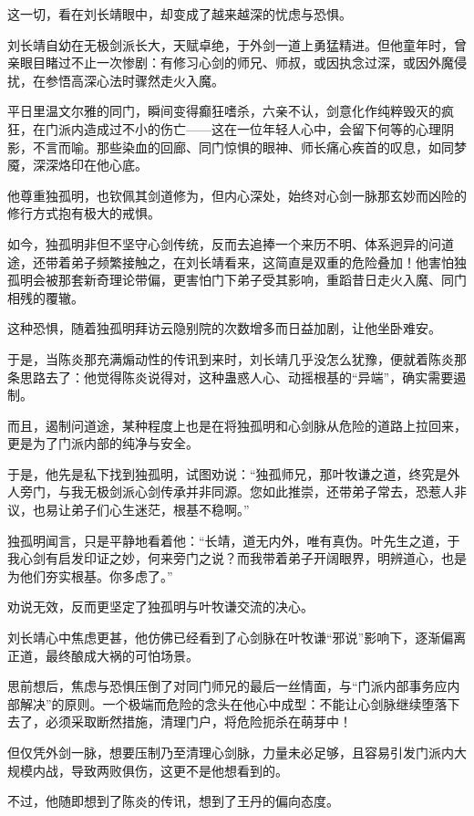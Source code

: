 这一切，看在刘长靖眼中，却变成了越来越深的忧虑与恐惧。

刘长靖自幼在无极剑派长大，天赋卓绝，于外剑一道上勇猛精进。但他童年时，曾亲眼目睹过不止一次惨剧：有修习心剑的师兄、师叔，或因执念过深，或因外魔侵扰，在参悟高深心法时骤然走火入魔。

平日里温文尔雅的同门，瞬间变得癫狂嗜杀，六亲不认，剑意化作纯粹毁灭的疯狂，在门派内造成过不小的伤亡——这在一位年轻人心中，会留下何等的心理阴影，不言而喻。那些染血的回廊、同门惊惧的眼神、师长痛心疾首的叹息，如同梦魇，深深烙印在他心底。

他尊重独孤明，也钦佩其剑道修为，但内心深处，始终对心剑一脉那玄妙而凶险的修行方式抱有极大的戒惧。

如今，独孤明非但不坚守心剑传统，反而去追捧一个来历不明、体系迥异的问道途，还带着弟子频繁接触之，在刘长靖看来，这简直是双重的危险叠加！他害怕独孤明会被那套新奇理论带偏，更害怕门下弟子受其影响，重蹈昔日走火入魔、同门相残的覆辙。

这种恐惧，随着独孤明拜访云隐别院的次数增多而日益加剧，让他坐卧难安。

于是，当陈炎那充满煽动性的传讯到来时，刘长靖几乎没怎么犹豫，便就着陈炎那条思路去了：他觉得陈炎说得对，这种蛊惑人心、动摇根基的“异端”，确实需要遏制。

而且，遏制问道途，某种程度上也是在将独孤明和心剑脉从危险的道路上拉回来，更是为了门派内部的纯净与安全。

于是，他先是私下找到独孤明，试图劝说：“独孤师兄，那叶牧谦之道，终究是外人旁门，与我无极剑派心剑传承并非同源。您如此推崇，还带弟子常去，恐惹人非议，也易让弟子们心生迷茫，根基不稳啊。”

独孤明闻言，只是平静地看着他：“长靖，道无内外，唯有真伪。叶先生之道，于我心剑有启发印证之妙，何来旁门之说？而我带着弟子开阔眼界，明辨道心，也是为他们夯实根基。你多虑了。”

劝说无效，反而更坚定了独孤明与叶牧谦交流的决心。

刘长靖心中焦虑更甚，他仿佛已经看到了心剑脉在叶牧谦“邪说”影响下，逐渐偏离正道，最终酿成大祸的可怕场景。

思前想后，焦虑与恐惧压倒了对同门师兄的最后一丝情面，与“门派内部事务应内部解决”的原则。一个极端而危险的念头在他心中成型：不能让心剑脉继续堕落下去了，必须采取断然措施，清理门户，将危险扼杀在萌芽中！

但仅凭外剑一脉，想要压制乃至清理心剑脉，力量未必足够，且容易引发门派内大规模内战，导致两败俱伤，这更不是他想看到的。

不过，他随即想到了陈炎的传讯，想到了王丹的偏向态度。

